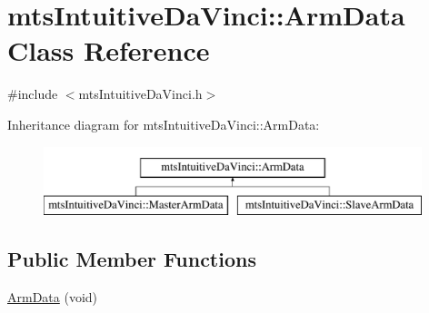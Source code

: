 \hypertarget{classmts_intuitive_da_vinci_1_1_arm_data}{}\section{mts\+Intuitive\+Da\+Vinci\+:\+:Arm\+Data Class Reference}
\label{classmts_intuitive_da_vinci_1_1_arm_data}


{\ttfamily \#include $<$mts\+Intuitive\+Da\+Vinci.\+h$>$}

Inheritance diagram for mts\+Intuitive\+Da\+Vinci\+:\+:Arm\+Data\+:\begin{figure}[H]
\begin{center}
\leavevmode
\includegraphics[height=2.000000cm]{d3/da6/classmts_intuitive_da_vinci_1_1_arm_data}
\end{center}
\end{figure}
\subsection*{Public Member Functions}
\begin{DoxyCompactItemize}
\item 
\hyperlink{classmts_intuitive_da_vinci_1_1_arm_data_a508861edc4d669d0b51459a9159e6f94}{Arm\+Data} (void)
\end{DoxyCompactItemize}
